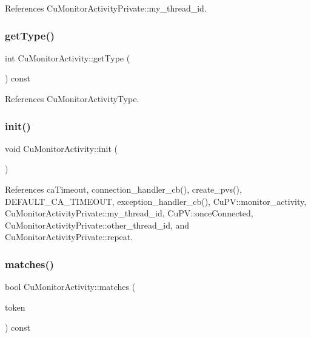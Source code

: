 References Cu\+Monitor\+Activity\+Private\+::my\+\_\+thread\+\_\+id.

\mbox{\label{classCuMonitorActivity_a7bcf41b05af2c5d047314a028e1dbdd7}} 
\subsubsection{get\+Type()}
{\footnotesize\ttfamily int Cu\+Monitor\+Activity\+::get\+Type (\begin{DoxyParamCaption}{ }\end{DoxyParamCaption}) const}



References Cu\+Monitor\+Activity\+Type.

\mbox{\label{classCuMonitorActivity_ace0cee769df1f3beda7b21b51e51aa2e}} 
\subsubsection{init()}
{\footnotesize\ttfamily void Cu\+Monitor\+Activity\+::init (\begin{DoxyParamCaption}{ }\end{DoxyParamCaption})\hspace{0.3cm}{\ttfamily [protected]}}



References ca\+Timeout, connection\+\_\+handler\+\_\+cb(), create\+\_\+pvs(), D\+E\+F\+A\+U\+L\+T\+\_\+\+C\+A\+\_\+\+T\+I\+M\+E\+O\+UT, exception\+\_\+handler\+\_\+cb(), Cu\+P\+V\+::monitor\+\_\+activity, Cu\+Monitor\+Activity\+Private\+::my\+\_\+thread\+\_\+id, Cu\+P\+V\+::once\+Connected, Cu\+Monitor\+Activity\+Private\+::other\+\_\+thread\+\_\+id, and Cu\+Monitor\+Activity\+Private\+::repeat.

\mbox{\label{classCuMonitorActivity_a6ba89bf4cdc89f9f6da06cdd51a7dd35}} 
\subsubsection{matches()}
{\footnotesize\ttfamily bool Cu\+Monitor\+Activity\+::matches (\begin{DoxyParamCaption}\item[{const Cu\+Data \&}]{token }\end{DoxyParamCaption}) const}

